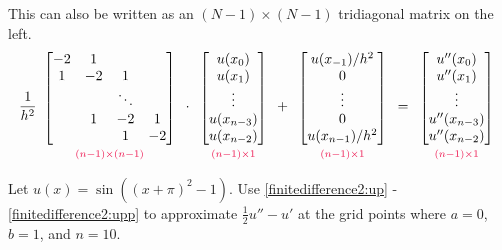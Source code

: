 \noindent This can also be written as an $(N-1)\times(N-1)$ tridiagonal matrix on the left.
\begin{align}
\frac{1}{h^2}
\begin{array}{c}
\begin{bmatrix}
-2 & 1 & \\
1 & -2 & 1  \\
& &\ddots & \\
 & 1 & -2 & 1 \\
 & & 1 & -2
\end{bmatrix}\\
{\scriptstyle\textcolor{red}{(n-1)\times(n-1)}}
\end{array}\cdot
\begin{array}{c}
\begin{bmatrix}
u(x_0) \\ u(x_1)\\ \vdots  \\ u(x_{n-3}) \\ u(x_{n-2})
\end{bmatrix}\\
{\scriptstyle\textcolor{red}{(n-1)\times1}}
\end{array} + 
\begin{array}{c}
\begin{bmatrix}
u(x_{-1})/h^2 \\ 0 \\ \vdots  \\ 0 \\ u(x_{n-1})/h^2
\end{bmatrix}\\
{\scriptstyle\textcolor{red}{(n-1)\times1}}
 \end{array} =
 \begin{array}{c}
\begin{bmatrix}
u''(x_0) \\ u''(x_1)\\ \vdots  \\ u''(x_{n-3}) \\ u''(x_{n-2})
\end{bmatrix}\\
{\scriptstyle\textcolor{red}{(n-1)\times1}}
\label{finitedifference2:upp}
\end{array}
\end{align}

\begin{problem}
	Let $u(x) = \sin((x+\pi)^2-1)$. Use \eqref{finitedifference2:up} - \eqref{finitedifference2:upp} to approximate $\frac{1}{2}u'' - u'$ at the grid points where $a=0$, $b=1$, and $n=10$. \label{prob:finitedifference2:prob1}
\end{problem}

